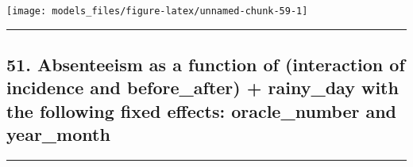 \documentclass[]{article}
\begin{document}
\begin{center}\texttt{[image: models\_files/figure-latex/unnamed-chunk-59-1]} \end{center}

\newpage

\begin{center}\rule{0.5\linewidth}{\linethickness}\end{center}

\subsection{51. Absenteeism as a function of (interaction of incidence
and before\_after) + rainy\_day with the following fixed effects:
oracle\_number and
year\_month}\label{absenteeism-as-a-function-of-interaction-of-incidence-and-before_after-rainy_day-with-the-following-fixed-effects-oracle_number-and-year_month}

\begin{center}\rule{0.5\linewidth}{\linethickness}\end{center}
\end{document}
